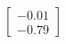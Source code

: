 \documentclass[preview]{standalone}
\begin{document}
\begin{align*}
\begin{bmatrix} -0.01 \\ -0.79 \end{bmatrix}
\end{align*}
\end{document}
